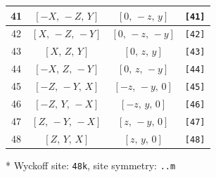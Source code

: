 \documentclass[fleqn,8pt]{jsarticle}
\begin{document}
\begin{longtable}{cccc}
41 & $\left[ - X,\, - Z,\, Y \right]$ & $\left[ 0,\, - z,\, y \right]$ & {\tt [41]} \\ \hline
42 & $\left[ X,\, - Z,\, - Y \right]$ & $\left[ 0,\, - z,\, - y \right]$ & {\tt [42]} \\ \hline
43 & $\left[ X,\, Z,\, Y \right]$ & $\left[ 0,\, z,\, y \right]$ & {\tt [43]} \\ \hline
44 & $\left[ - X,\, Z,\, - Y \right]$ & $\left[ 0,\, z,\, - y \right]$ & {\tt [44]} \\ \hline
45 & $\left[ - Z,\, - Y,\, X \right]$ & $\left[ - z,\, - y,\, 0 \right]$ & {\tt [45]} \\ \hline
46 & $\left[ - Z,\, Y,\, - X \right]$ & $\left[ - z,\, y,\, 0 \right]$ & {\tt [46]} \\ \hline
47 & $\left[ Z,\, - Y,\, - X \right]$ & $\left[ z,\, - y,\, 0 \right]$ & {\tt [47]} \\ \hline
48 & $\left[ Z,\, Y,\, X \right]$ & $\left[ z,\, y,\, 0 \right]$ & {\tt [48]} \\
\end{longtable}
* Wyckoff site: {\tt 48k}, site symmetry: {\tt ..m}
\renewcommand{\arraystretch}{1.2}
\end{document}
